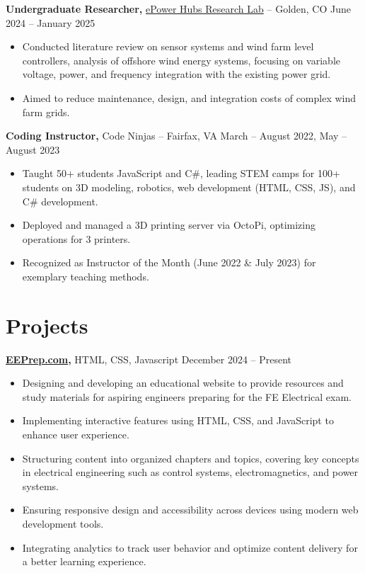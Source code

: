 \documentclass[11pt]{article}       %
\begin{document}
\textbf{Undergraduate Researcher, }{\href{https://www.epowerhubs.com/home}{ePower Hubs Research Lab}} -- Golden, CO \hfill June 2024 -- January 2025 \\
\vspace{-6.5pt}
\begin{itemize}
  \item Conducted literature review on sensor systems and wind farm level controllers, analysis of offshore wind energy systems, focusing on variable voltage, power, and frequency integration with the existing power grid.
  \item Aimed to reduce maintenance, design, and integration costs of complex wind farm grids.
\end{itemize}


\textbf{Coding Instructor, }{Code Ninjas} -- Fairfax, VA \hfill March -- August 2022, May -- August 2023 \\
\vspace{-6.5pt}
\begin{itemize}
  \item Taught 50+ students JavaScript and C\#, leading STEM camps for 100+ students on 3D modeling, robotics, web development (HTML, CSS, JS), and C\# development.
  \item Deployed and managed a 3D printing server via OctoPi, optimizing operations for 3 printers.
  \item Recognized as Instructor of the Month (June 2022 \& July 2023) for exemplary teaching methods.
\end{itemize}

\vspace{-19pt}
\section*{Projects}

\textbf{\href{https://eeprep.com}{EEPrep.com}, }{HTML, CSS, Javascript } \hfill {December 2024 -- Present} \\
\vspace{-6.5pt}
\begin{itemize}
    \item Designing and developing an educational website to provide resources and study materials for aspiring engineers preparing for the FE Electrical exam.
    \item Implementing interactive features using HTML, CSS, and JavaScript to enhance user experience.
    \item Structuring content into organized chapters and topics, covering key concepts in electrical engineering such as control systems, electromagnetics, and power systems.
    \item Ensuring responsive design and accessibility across devices using modern web development tools.
    \item Integrating analytics to track user behavior and optimize content delivery for a better learning experience.
\end{itemize}
\end{document}
